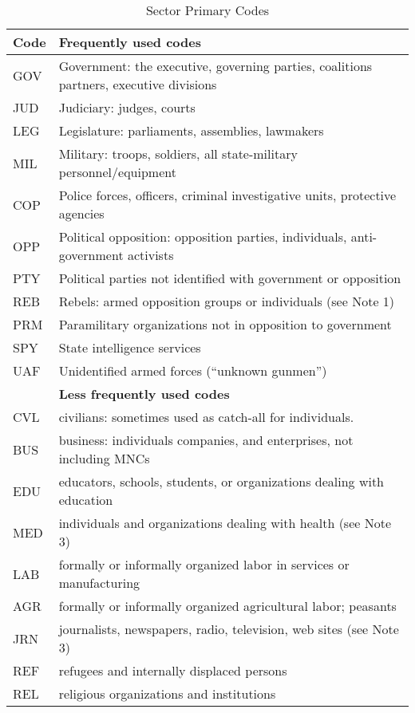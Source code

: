 \documentclass[11pt]{report}
\begin{document}
\begin{center}
\begin{longtable}{|l|p{13cm}|}
\caption{Sector Primary Codes}
\label{tab:roles}
 \\ \cline{1-2}
  \textbf{Code} & \textbf{Frequently used codes}\\
  \hline
	  GOV & Government: the executive, governing parties, coalitions partners, executive divisions \\ 
	  JUD & Judiciary: judges, courts \\ 
	  LEG & Legislature: parliaments, assemblies, lawmakers \\
	  MIL & Military: troops, soldiers, all state-military personnel/equipment\\ 
	  COP & Police forces, officers, criminal investigative units, protective agencies \\ 
	  OPP & Political opposition: opposition parties, individuals, anti-government activists \\
	  PTY & Political parties not identified with government or opposition \\
	  REB & Rebels: armed opposition groups or individuals (see Note 1)\\ 
	  PRM & Paramilitary organizations not in opposition to government\\ 
	  SPY & State intelligence services \\ 
	  UAF & Unidentified armed forces (``unknown gunmen'') \\ 
  \hline
~   & \textbf{Less frequently used codes}\\
 \hline
	  CVL & civilians: sometimes used as catch-all for individuals.  \\
	  BUS & business: individuals companies, and enterprises, not including MNCs \\  
	  EDU & educators, schools, students, or organizations dealing with education \\ 
	  MED & individuals and organizations dealing with health (see Note 3) \\
	  LAB & formally or informally organized labor in services or manufacturing \\
	  AGR & formally or informally organized agricultural labor; peasants \\
	  JRN & journalists, newspapers, radio, television, web sites (see Note 3)  \\ 
	  REF & refugees and internally displaced persons \\
	  REL & religious organizations and institutions \\ 

\end{longtable}
\end{center}
\end{document}
